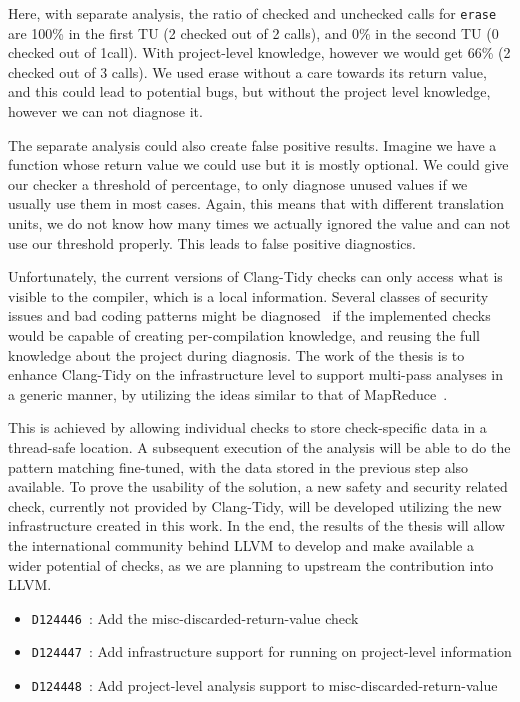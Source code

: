 Here, with separate analysis, the ratio of checked and unchecked calls for \texttt{erase} are 100\% in the first TU (2 checked out of 2 calls),
and 0\% in the second TU (0 checked out of 1call). With project-level knowledge, however we
would get 66\%  (2 checked out of 3 calls). We used erase without a care towards its return value, and this could lead to potential bugs, but without the project
level knowledge, however we can not diagnose it.

The separate analysis could also create false positive results. Imagine we have a function whose return value we could use but it is mostly
optional. We could give our checker a threshold of percentage, to only diagnose unused values if we usually use them in most cases. Again, this
means that with different translation units, we do not know how many times we actually ignored the value and can not use our threshold properly.
This leads to false positive diagnostics.

Unfortunately, the current versions of Clang-Tidy checks can only access what is visible to the compiler, which is a local information.
Several classes of security issues and bad coding patterns might be diagnosed~\cite{googlearticle} if the implemented checks would be 
capable of creating per-compilation knowledge, and reusing the full knowledge about the project during diagnosis.
The work of the thesis is to enhance Clang-Tidy on the infrastructure level to support multi-pass analyses in a generic manner, by 
utilizing the ideas similar to that of MapReduce~\cite{mapreduce}.

This is achieved by allowing individual checks to store check-specific data in a thread-safe location.
A subsequent execution of the analysis will be able to do the pattern matching fine-tuned, with the data stored in the previous step also
available.
To prove the usability of the solution, a new safety and security related check, currently not provided by Clang-Tidy, will be developed
utilizing the new infrastructure created in this work.
In the end, the results of the thesis will allow the international community behind LLVM to develop and make available a wider potential of
checks, as we are planning to upstream the contribution into LLVM. 

\begin{itemize}
    \item \texttt{D124446}~\cite{upstream1}: Add the misc-discarded-return-value check
    \item \texttt{D124447}~\cite{upstream2}: Add infrastructure support for running on project-level information
    \item \texttt{D124448}~\cite{upstream3}: Add project-level analysis support to misc-discarded-return-value
\end{itemize}

